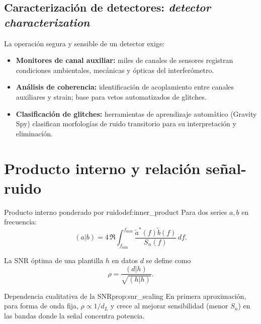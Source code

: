 \subsection{Caracterización de detectores: \emph{detector characterization}}

La operación segura y sensible de un detector exige:

\begin{itemize}[leftmargin=2em]
  \item \textbf{Monitores de canal auxiliar:} miles de canales de sensores registran condiciones ambientales, mecánicas y ópticas del interferómetro.
  \item \textbf{Análisis de coherencia:} identificación de acoplamiento entre canales auxiliares y strain; base para vetos automatizados de glitches.
  \item \textbf{Clasificación de glitches:} herramientas de aprendizaje automático (Gravity Spy) clasifican morfologías de ruido transitorio para su interpretación y eliminación.
\end{itemize}

\section{Producto interno y relación señal-ruido}
\label{sec:snr_producto}

\begin{definicion}{Producto interno ponderado por ruido}{def:inner_product}
Para dos series $a,b$ en frecuencia:
\begin{equation}
(a|b)=4\,\Re\int_{f_{\min}}^{f_{\max}}
\frac{\tilde a^\ast(f)\tilde b(f)}{S_n(f)}\,df.
\label{eq:inner_product}
\end{equation}
\end{definicion}

La SNR óptima de una plantilla $h$ en datos $d$ se define como
\begin{equation}
\rho=\frac{(d|h)}{\sqrt{(h|h)}}.
\label{eq:snr}
\end{equation}

\begin{proposicion}{Dependencia cualitativa de la SNR}{prop:snr_scaling}
En primera aproximación, para forma de onda fija, $\rho\propto 1/d_L$ y crece al mejorar sensibilidad (menor $S_n$) en las bandas donde la señal concentra potencia.
\end{proposicion}


